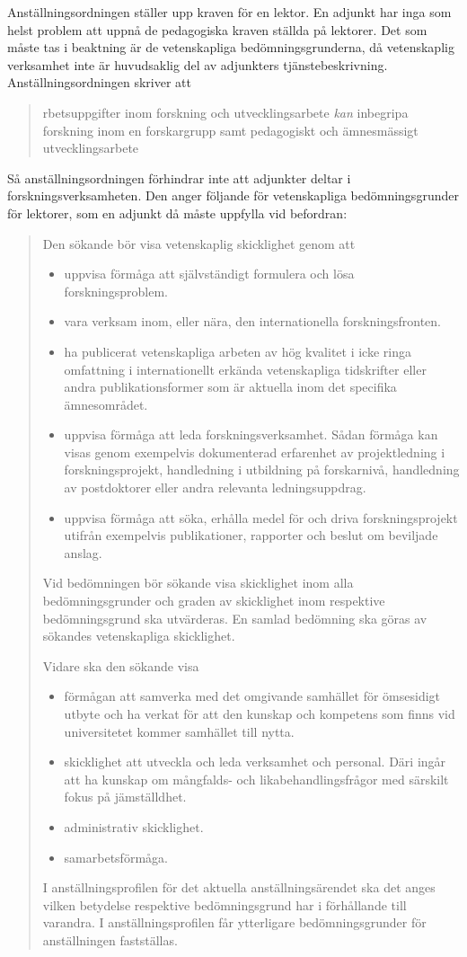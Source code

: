 \documentclass[a4paper,oneside,article,swedish]{memoir}
\begin{document}
Anställningsordningen\autocite{Anställningsordning} ställer upp kraven för en 
lektor.
En adjunkt har inga som helst problem att uppnå de pedagogiska kraven ställda 
på lektorer.
Det som måste tas i beaktning är de vetenskapliga bedömningsgrunderna, då 
vetenskaplig verksamhet inte är huvudsaklig del av adjunkters 
tjänstebeskrivning.
Anställningsordningen skriver att
\blockcquote[s.~20, min emfas]{Anställningsordning}{%
  rbetsuppgifter inom forskning och utvecklingsarbete \emph{kan} 
  inbegripa forskning inom en forskargrupp samt pedagogiskt och ämnesmässigt 
  utvecklingsarbete%
}.
Så anställningsordningen förhindrar inte att adjunkter deltar i 
forskningsverksamheten.
Den anger följande för vetenskapliga bedömningsgrunder för lektorer, som en 
adjunkt då måste uppfylla vid befordran:
\blockcquote[ss.~11--12]{Anställningsordning}{%
  Den sökande bör visa vetenskaplig skicklighet genom att
  \begin{itemize}
    \item uppvisa förmåga att självständigt formulera och lösa forskningsproblem.
    \item vara verksam inom, eller nära, den internationella forskningsfronten.
    \item ha publicerat vetenskapliga arbeten av hög kvalitet i icke ringa 
      omfattning i internationellt erkända vetenskapliga tidskrifter eller andra 
      publikationsformer som är aktuella inom det specifika ämnesområdet.
    \item uppvisa förmåga att leda forskningsverksamhet. Sådan förmåga kan visas 
      genom exempelvis dokumenterad erfarenhet av projektledning i 
      forskningsprojekt, handledning i utbildning på forskarnivå, handledning av 
      postdoktorer eller andra relevanta ledningsuppdrag.
    \item uppvisa förmåga att söka, erhålla medel för och driva forskningsprojekt 
      utifrån exempelvis publikationer, rapporter och beslut om beviljade anslag.
  \end{itemize}
  Vid bedömningen bör sökande visa skicklighet inom alla bedömningsgrunder och 
  graden av skicklighet inom respektive bedömningsgrund ska utvärderas. En samlad 
  bedömning ska göras av sökandes vetenskapliga skicklighet.

  Vidare ska den sökande visa
  \begin{itemize}
    \item förmågan att samverka med det omgivande samhället för ömsesidigt utbyte 
      och ha verkat för att den kunskap och kompetens som finns vid universitetet 
      kommer samhället till nytta.
    \item skicklighet att utveckla och leda verksamhet och personal. Däri ingår 
      att ha kunskap om mångfalds- och likabehandlingsfrågor med särskilt fokus 
      på jämställdhet.
    \item administrativ skicklighet.
    \item samarbetsförmåga.
  \end{itemize}
  I anställningsprofilen för det aktuella anställningsärendet ska det anges 
  vilken betydelse respektive bedömningsgrund har i förhållande till varandra. I 
  anställningsprofilen får ytterligare bedömningsgrunder för anställningen 
  fastställas.%
}
\end{document}
